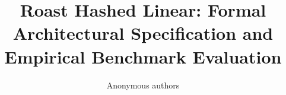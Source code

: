\title{\textbf{Roast Hashed Linear: Formal Architectural Specification and Empirical Benchmark Evaluation}}

\author{Anonymous authors}
